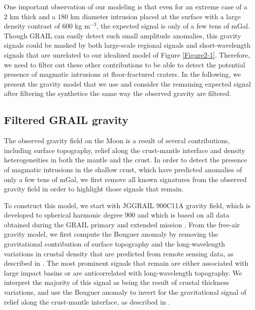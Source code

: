 One important observation of our modeling  is that even for an extreme
case of a $2$ km thick and a $180$ km diameter intrusion placed at the
surface  with a  large  density  contrast of  $600$  kg m$^{-3}$,  the
expected signal is only of a few tens of mGal. Though GRAIL can easily
detect such small  amplitude anomalies, this gravity  signals could be
masked  by  both  large-scale regional  signals  and  short-wavelength
signals  that  are   unrelated  to  our  idealized   model  of  Figure
\ref{Figure2-1}.   Therefore,  we  need  to  filter  out  these  other
contributions to be able to  detect the potential presence of magmatic
intrusions at  floor-fractured craters.  In the  following, we present
the  gravity model  that we  use and  consider the  remaining expected
signal  after  filtering the  synthetics  the  same way  the  observed
gravity are filtered.

\subsection{Filtered GRAIL gravity}
\label{sec:grails-gravity-model-1}

The  observed  gravity field  on  the  Moon  is  a result  of  several
contributions,   including  surface   topography,  relief   along  the
crust-mantle interface and density  heterogeneities in both the mantle
and the crust. In order to  detect the presence of magmatic intrusions
in the  shallow crust, which  have predicted  anomalies of only  a few
tens of mGal,  we first remove all known signatures  from the observed
gravity field in order to highlight those signals that remain.

To construct this model, we  start with JGGRAIL 900C11A gravity field,
which is developed to spherical harmonic degree 900 and which is based
on all  data obtained  during the GRAIL  primary and  extended mission
\citep{Konopliv:2014gm}.  From  the free-air  gravity model,  we first
compute the Bouguer anomaly by removing the gravitational contribution
of surface  topography and  the long-wavelength variations  in crustal
density that are  predicted from remote sensing data,  as described in
\citet{Wieczorek:2013ipa}. The most prominent  signals that remain are
either associated with large impact  basins or are anticorrelated with
long-wavelength topography.  We interpret  the majority of this signal
as  being the  result of  crustal  thickness variations,  and use  the
Bouguer anomaly to invert for the gravitational signal of relief along
the crust-mantle interface, as described in \citet{Wieczorek:2013ipa}.


